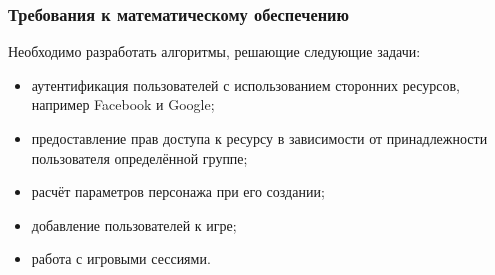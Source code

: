 \subsubsection{Требования к математическому обеспечению}

Необходимо разработать алгоритмы, решающие следующие задачи:

\begin{itemize}
\item аутентификация пользователей с использованием сторонних ресурсов, например Facebook и Google;
\item предоставление прав доступа к ресурсу в зависимости от принадлежности пользователя определённой группе;
\item расчёт параметров персонажа при его создании;
\item добавление пользователей к игре;
\item работа с игровыми сессиями.
\end{itemize}
